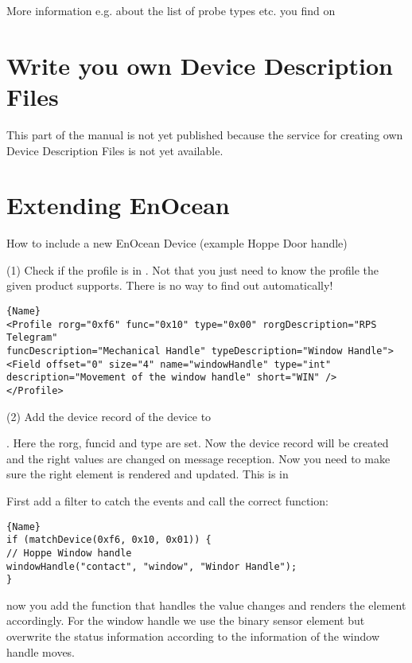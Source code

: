More information e.g. about the list of probe types etc. you find on 


\section{Write you own Device Description Files}
\label {newddr} 

This part of the manual is not yet published because the service for creating own Device 
Description Files is not yet available.

\section{Extending EnOcean}
\label{addenocean}

How to include a new EnOcean Device (example Hoppe Door handle)

(1) Check if the profile is in . Not that 
you just need to know the profile the given product supports. There is no way 
to find out automatically! 

\begin{lstlisting}[caption=EnOcean Profile Entry,basicstyle=\small,columns=fullflexible]{Name}
<Profile rorg="0xf6" func="0x10" type="0x00" rorgDescription="RPS Telegram" 
funcDescription="Mechanical Handle" typeDescription="Window Handle">
<Field offset="0" size="4" name="windowHandle" type="int" 
description="Movement of the window handle" short="WIN" />
</Profile>
\end{lstlisting}

(2) Add the device record of the device to 

{\small
{}. 
}
Here the rorg, funcid and type are set. Now the device record will be created and the 
right values are changed on message reception. Now you need to make sure the right  
element is rendered and updated. This is 
in 

First add a filter to catch the events and call the correct function:

\begin{lstlisting}[caption=Catch Device IDs,basicstyle=\small,columns=fullflexible]{Name}
if (matchDevice(0xf6, 0x10, 0x01)) {
// Hoppe Window handle
windowHandle("contact", "window", "Windor Handle"); 
}
\end{lstlisting}
now you add the function that handles the value changes and renders the element 
accordingly. For the window handle we use the binary sensor element but overwrite 
the status information according to the information of the window handle moves.  

